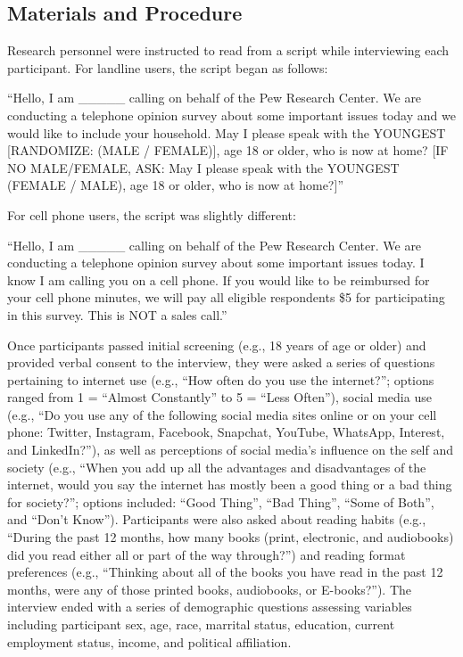 \documentclass[man, fleqn, noextraspace]{apa6}
\theoremstyle{definition}
\theoremstyle{definition}
\theoremstyle{definition}
\theoremstyle{remark}
\begin{document}
\subsection{Materials and Procedure}\label{materials-and-procedure}

Research personnel were instructed to read from a script while
interviewing each participant. For landline users, the script began as
follows:

\enquote{Hello, I am \_\_\_\_\_ calling on behalf of the Pew Research
Center. We are conducting a telephone opinion survey about some
important issues today and we would like to include your household. May
I please speak with the YOUNGEST {[}RANDOMIZE: (MALE / FEMALE){]}, age
18 or older, who is now at home? {[}IF NO MALE/FEMALE, ASK: May I please
speak with the YOUNGEST (FEMALE / MALE), age 18 or older, who is now at
home?{]}}

For cell phone users, the script was slightly different:

\enquote{Hello, I am \_\_\_\_\_ calling on behalf of the Pew Research
Center. We are conducting a telephone opinion survey about some
important issues today. I know I am calling you on a cell phone. If you
would like to be reimbursed for your cell phone minutes, we will pay all
eligible respondents \$5 for participating in this survey. This is NOT a
sales call.}

Once participants passed initial screening (e.g., 18 years of age or
older) and provided verbal consent to the interview, they were asked a
series of questions pertaining to internet use (e.g., \enquote{How often
do you use the internet?}; options ranged from 1 = \enquote{Almost
Constantly} to 5 = \enquote{Less Often}), social media use (e.g.,
\enquote{Do you use any of the following social media sites online or on
your cell phone: Twitter, Instagram, Facebook, Snapchat, YouTube,
WhatsApp, Interest, and LinkedIn?}), as well as perceptions of social
media's influence on the self and society (e.g., \enquote{When you add
up all the advantages and disadvantages of the internet, would you say
the internet has mostly been a good thing or a bad thing for society?};
options included: \enquote{Good Thing}, \enquote{Bad Thing},
\enquote{Some of Both}, and \enquote{Don't Know}). Participants were
also asked about reading habits (e.g., \enquote{During the past 12
months, how many books (print, electronic, and audiobooks) did you read
either all or part of the way through?}) and reading format preferences
(e.g., \enquote{Thinking about all of the books you have read in the
past 12 months, were any of those printed books, audiobooks, or
E-books?}). The interview ended with a series of demographic questions
assessing variables including participant sex, age, race, marrital
status, education, current employment status, income, and political
affiliation.
\end{document}

